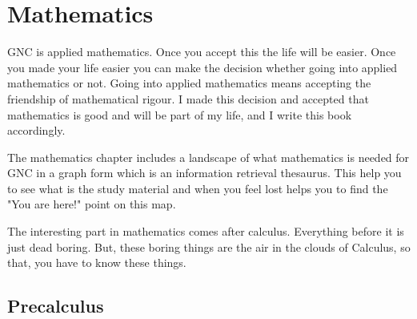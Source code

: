 \part{Mathematics}

GNC is applied mathematics. Once you accept this the life will be easier. Once
you made your life easier you can make the decision whether going into applied
mathematics or not. Going into applied mathematics means accepting the
friendship of mathematical rigour. I made this decision and accepted that
mathematics is good and will be part of my life, and I write this book
accordingly.

The mathematics chapter includes a landscape of what mathematics is needed for
GNC in a graph form which is an information retrieval thesaurus. This help you
to see what is the study material and when you feel lost helps you to find the
"You are here!" point on this map.

The interesting part in mathematics comes after calculus. Everything before it
is just dead boring. But, these boring things are the air in the clouds of
Calculus, so that, you have to know these things.



\chapter{Precalculus}


